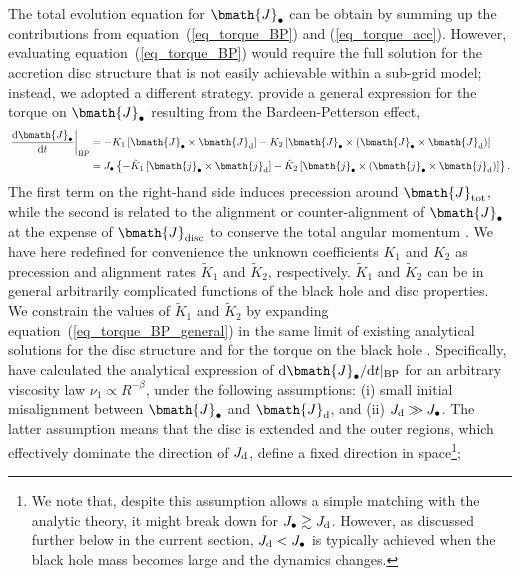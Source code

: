 \documentclass[a4paper,fleqn,usenatbib]{mnras}
\begin{document}
The total evolution equation for $\bmath{J}_{\bullet}$ can be obtain by summing up the contributions from equation~(\ref{eq_torque_BP}) and (\ref{eq_torque_acc}).
However, evaluating equation~(\ref{eq_torque_BP}) would require the full solution for the accretion disc structure that is not easily achievable within a sub-grid model; instead, we adopted a different strategy.
\citet{king+05} provide a general expression for the torque on $\bmath{J}_{\bullet}$ resulting from the Bardeen-Petterson effect, 
\begin{equation}\label{eq_torque_BP_general}
\begin{aligned}
\left. \frac{{\rm d} \bmath{J}_{\bullet}}{{\rm d}t} \right|_{\rm BP} & = -K_{1} \left[\bmath{J}_{\bullet} \times \bmath{J}_{\rm d} \right] - K_{2} \left[ \bmath{J}_{\bullet} \times \left( \bmath{J}_{\bullet} \times \bmath{J}_{\rm d} \right) \right] \\
& = J_{\bullet} \left\{-\tilde{K}_{1} \left[\bmath{j}_{\bullet} \times \bmath{j}_{\rm d} \right] - \tilde{K}_{2} \left[ \bmath{j}_{\bullet} \times \left( \bmath{j}_{\bullet} \times \bmath{j}_{\rm d} \right) \right]\right\}.
\end{aligned}
\end{equation}
The first term on the right-hand side induces precession around $\bmath{J}_{\rm tot}$, while the second is related to the alignment or counter-alignment of $\bmath{J}_{\bullet}$ at the expense of $\bmath{J}_{\rm disc}$ to conserve the total angular momentum \citep{king+05}.
We have here redefined for convenience the unknown coefficients $K_{1}$ and $K_{2}$ as precession and alignment rates $\tilde{K}_{1}$ and $\tilde{K}_{2}$, respectively.
$\tilde{K}_{1}$ and $\tilde{K}_{2}$ can be in general arbitrarily complicated functions of the black hole and disc properties.
We constrain the values of $\tilde{K}_{1}$ and $\tilde{K}_{2}$ by expanding equation~(\ref{eq_torque_BP_general}) in the same limit of existing analytical solutions for the disc structure and for the torque on the black hole \citep{scheuer+96,martin+07,perego+09}.
Specifically, \citet{martin+07} have calculated the analytical expression of ${\rm d}\bmath{J}_{\bullet} / {\rm d}t|_{\rm BP}$ for an arbitrary viscosity law $\nu_{1} \propto R^{-\beta}$, under the following assumptions: (i) small initial misalignment between $\bmath{J}_{\bullet}$ and $\bmath{J}_{\rm d}$, and (ii) $J_{\rm d} \gg
J_{\bullet}$.
The latter assumption means that the disc is extended and the outer regions, which effectively dominate the direction of $J_{\rm d}$, define a fixed direction in space\footnote{We note that, despite this assumption allows a simple matching with the analytic theory, it might break down for $J_{\bullet} \gtrsim J_{\rm d}$.
However, as discussed further below in the current section, $J_{\rm d} < J_{\bullet}$ is typically achieved when the black hole mass becomes large and the dynamics changes.};
\end{document}
